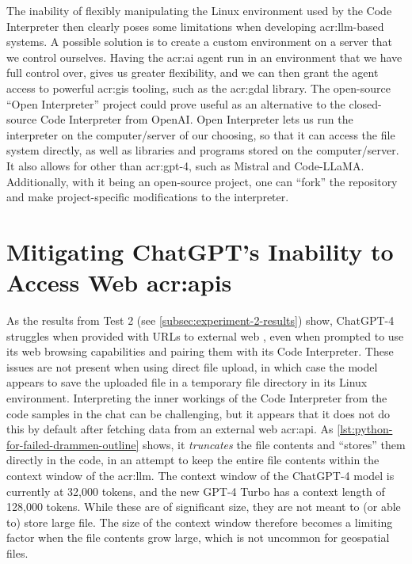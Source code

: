 The inability of flexibly manipulating the Linux environment used by the Code Interpreter then clearly poses some limitations when developing \acrshort{acr:llm}-based systems. A possible solution is to create a custom environment on a server that we control ourselves. Having the \acrshort{acr:ai} agent run in an environment that we have full control over, gives us greater flexibility, and we can then grant the agent access to powerful \acrshort{acr:gis} tooling, such as the \acrshort{acr:gdal} library. The open-source \enquote{Open Interpreter} project \citep{killianlucasKillianLucasOpeninterpreter2023} could prove useful as an alternative to the closed-source Code Interpreter from OpenAI. Open Interpreter lets us run the interpreter on the computer/server of our choosing, so that it can access the file system directly, as well as libraries and programs stored on the computer/server. It also allows for other  than \acrshort{acr:gpt}-4, such as Mistral  and Code-LLaMA. Additionally, with it being an open-source project, one can \enquote{fork} the repository and make project-specific modifications to the interpreter.

\section[Mitigating ChatGPT's Inability to Access Web APIs]{Mitigating ChatGPT's Inability to Access Web \acrshort{acr:api}s}\label{sec:api-access-discussion}

As the results from Test 2 (see \autoref{subsec:experiment-2-results}) show, ChatGPT-4 struggles when provided with URLs to external web , even when prompted to use its web browsing capabilities and pairing them with its Code Interpreter. These issues are not present when using direct file upload, in which case the model appears to save the uploaded file in a temporary file directory in its Linux environment. Interpreting the inner workings of the Code Interpreter from the code samples in the chat can be challenging, but it appears that it does not do this by default after fetching data from an external web \acrshort{acr:api}. As \autoref{lst:python-for-failed-drammen-outline} shows, it \textit{truncates} the file contents and \enquote{stores} them directly in the code, in an attempt to keep the entire file contents within the context window of the \acrshort{acr:llm}. The context window of the ChatGPT-4 model is currently at 32,000 tokens, and the new GPT-4 Turbo has a context length of 128,000 tokens. While these are of significant size, they are not meant to (or able to) store large file. The size of the context window therefore becomes a limiting factor when the file contents grow large, which is not uncommon for geospatial files.

